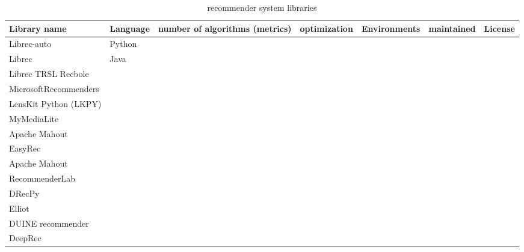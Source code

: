 \begin{table}[tb]
\centering
\caption{recommender system libraries}
\label{tab:fair_libs}
\begin{tabular}{lllllll}
\toprule
Library name        & Language      & number of algorithms (metrics)      & optimization       & Environments    & maintained      & License\\\midrule
Librec-auto         & Python           &  \\
Librec              & Java             &  \\
Librec TRSL
Recbole        &              &  \\
MicrosoftRecommenders         &              &  \\
LensKit Python (LKPY)            &  \\
MyMediaLite                &  &  \\

Apache Mahout             &  \\
EasyRec             &  \\
Apache Mahout             &  \\
RecommenderLab             &  \\
DRecPy              &   \\
Elliot              & \\
DUINE recommender   & \\
DeepRec     &\\


\bottomrule
                                 
\end{tabular}
\end{table}



